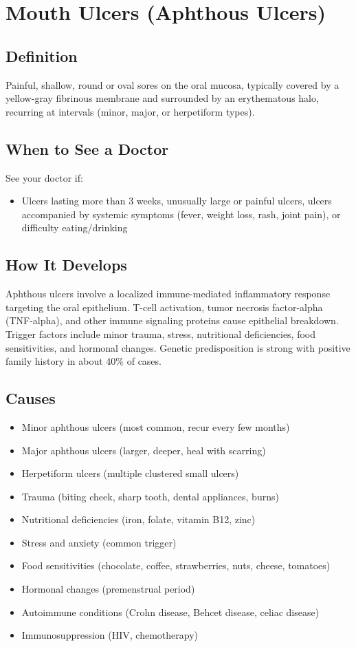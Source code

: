 \chapter{Mouth Ulcers (Aphthous Ulcers)}

\section*{Definition}
Painful, shallow, round or oval sores on the oral mucosa, typically covered by a yellow-gray fibrinous membrane and surrounded by an erythematous halo, recurring at intervals (minor, major, or herpetiform types).

\section*{When to See a Doctor}
See your doctor if:
\begin{itemize}
  \item Ulcers lasting more than 3 weeks, unusually large or painful ulcers, ulcers accompanied by systemic symptoms (fever, weight loss, rash, joint pain), or difficulty eating/drinking
\end{itemize}

\section*{How It Develops}
Aphthous ulcers involve a localized immune-mediated inflammatory response targeting the oral epithelium. T-cell activation, tumor necrosis factor-alpha (TNF-alpha), and other immune signaling proteins cause epithelial breakdown. Trigger factors include minor trauma, stress, nutritional deficiencies, food sensitivities, and hormonal changes. Genetic predisposition is strong with positive family history in about 40\% of cases.

\section*{Causes}
\begin{itemize}
  \item Minor aphthous ulcers (most common, recur every few months)
  \item Major aphthous ulcers (larger, deeper, heal with scarring)
  \item Herpetiform ulcers (multiple clustered small ulcers)
  \item Trauma (biting cheek, sharp tooth, dental appliances, burns)
  \item Nutritional deficiencies (iron, folate, vitamin B12, zinc)
  \item Stress and anxiety (common trigger)
  \item Food sensitivities (chocolate, coffee, strawberries, nuts, cheese, tomatoes)
  \item Hormonal changes (premenstrual period)
  \item Autoimmune conditions (Crohn disease, Behcet disease, celiac disease)
  \item Immunosuppression (HIV, chemotherapy)
\end{itemize}

